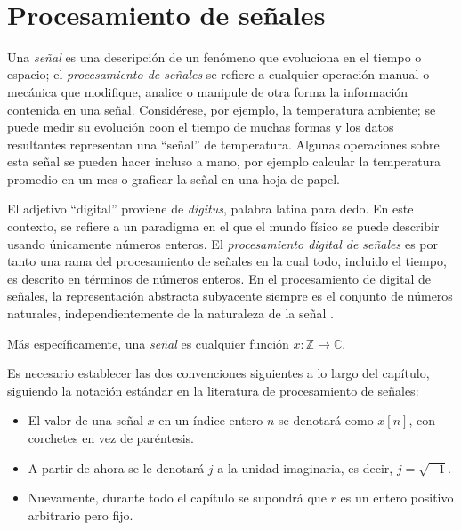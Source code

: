 \newpage
\thispagestyle{empty}
\
\newpage
\section{Procesamiento de señales}

Una \emph{señal} es una descripción de un fenómeno que evoluciona en el tiempo o espacio; el \emph{procesamiento de señales} se refiere a cualquier operación manual o mecánica que modifique, analice o manipule de otra forma la información contenida en una señal. Considérese, por ejemplo, la temperatura ambiente; se puede medir su evolución coon el tiempo de muchas formas y los datos resultantes representan una ``señal'' de temperatura. Algunas operaciones sobre esta señal se pueden hacer incluso a mano, por ejemplo calcular la temperatura promedio en un mes o graficar la señal en una hoja de papel.

\bigskip

El adjetivo ``digital'' proviene de \emph{digitus}, palabra latina para dedo. En este contexto, se refiere a un paradigma en el que el mundo físico se puede describir usando únicamente números enteros.
El \emph{procesamiento digital de señales} es por tanto una rama del procesamiento de señales en la cual todo, incluido el tiempo, es descrito en términos de números enteros. En el procesamiento de digital de señales, la representación abstracta subyacente siempre es el conjunto de números naturales, independientemente de la naturaleza de la señal \cite{Prand1}.

\begin{definition}
Más específicamente, una \emph{señal} es cualquier función $x : \mathbb{Z} \longrightarrow \mathbb{C}$.
\end{definition}

\begin{remark}
Es necesario establecer las dos convenciones siguientes a lo largo del capítulo, siguiendo la notación estándar en la literatura de procesamiento de señales:
\begin{itemize}
\item El valor de una señal $x$ en un índice entero $n$ se denotará como $x[n]$, con corchetes en vez de paréntesis.
\item A partir de ahora se le denotará $j$ a la unidad imaginaria, es decir, $j = \sqrt{-1}$.
\item Nuevamente, durante todo el capítulo se supondrá que $r$ es un entero positivo arbitrario pero fijo.
\end{itemize}
\end{remark}

